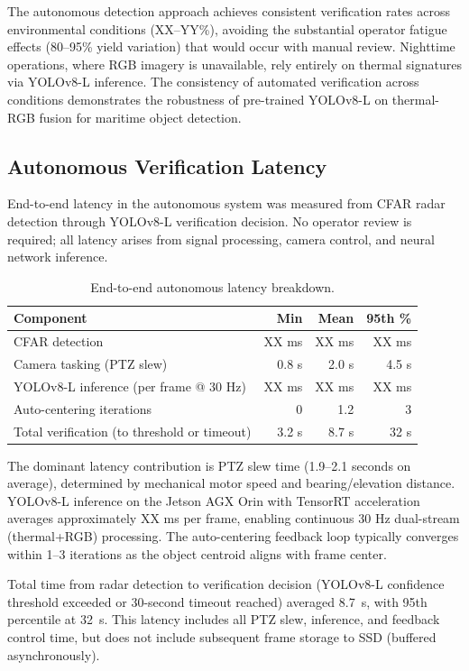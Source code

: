 \documentclass[conf]{asmeconf}
\begin{document}
The autonomous detection approach achieves consistent verification rates across environmental conditions (XX--YY\%), avoiding the substantial operator fatigue effects (80--95\% yield variation) that would occur with manual review. Nighttime operations, where RGB imagery is unavailable, rely entirely on thermal signatures via YOLOv8-L inference. The consistency of automated verification across conditions demonstrates the robustness of pre-trained YOLOv8-L on thermal-RGB fusion for maritime object detection.

\subsection{Autonomous Verification Latency}

End-to-end latency in the autonomous system was measured from CFAR radar detection through YOLOv8-L verification decision. No operator review is required; all latency arises from signal processing, camera control, and neural network inference.

\begin{table}[t]
\caption{End-to-end autonomous latency breakdown.}
\label{tab:latency_autonomous}
\centering
\small
\begin{tabular}{@{}lrrr@{}}
\toprule
Component & Min & Mean & 95th \% \\
\midrule
CFAR detection & XX ms & XX ms & XX ms \\
Camera tasking (PTZ slew) & 0.8 s & 2.0 s & 4.5 s \\
YOLOv8-L inference (per frame @ 30 Hz) & XX ms & XX ms & XX ms \\
Auto-centering iterations & 0 & 1.2 & 3 \\
Total verification (to threshold or timeout) & 3.2 s & 8.7 s & 32 s \\
\bottomrule
\end{tabular}
\end{table}

The dominant latency contribution is PTZ slew time (1.9--2.1 seconds on average), determined by mechanical motor speed and bearing/elevation distance. YOLOv8-L inference on the Jetson AGX Orin with TensorRT acceleration averages approximately XX ms per frame, enabling continuous 30 Hz dual-stream (thermal+RGB) processing. The auto-centering feedback loop typically converges within 1--3 iterations as the object centroid aligns with frame center.

Total time from radar detection to verification decision (YOLOv8-L confidence threshold exceeded or 30-second timeout reached) averaged \SI{8.7}{s}, with 95th percentile at \SI{32}{s}. This latency includes all PTZ slew, inference, and feedback control time, but does not include subsequent frame storage to SSD (buffered asynchronously).
\end{document}
